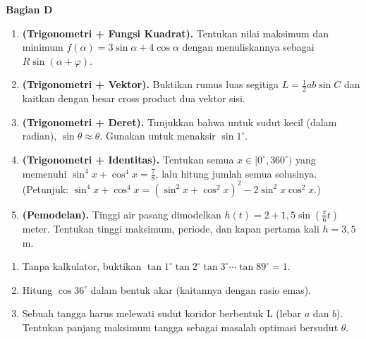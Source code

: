 \documentclass[11pt,a4paper]{report}
\theoremstyle{gaya}
\newcommand{\bagiansoal}[2]{%
  \par\medskip\noindent
  {\large\bfseries\color{biru}Bagian #1}\par\smallskip
  \addcontentsline{toc}{subsection}{Bagian #1}}
\begin{document}
\bagiansoal{D}{Expert (setara tahun pertama universitas --- sintesis antarbab)}
\begin{enumerate}[leftmargin=*]
  \item \textbf{(Trigonometri + Fungsi Kuadrat).} Tentukan nilai maksimum dan minimum $f(\alpha)=3\sin\alpha+4\cos\alpha$ dengan menuliskannya sebagai $R\sin(\alpha+\varphi)$.
  \item \textbf{(Trigonometri + Vektor).} Buktikan rumus luas segitiga $L=\tfrac12 ab\sin C$ dan kaitkan dengan besar cross product dua vektor sisi.
  \item \textbf{(Trigonometri + Deret).} Tunjukkan bahwa untuk sudut kecil (dalam radian), $\sin\theta\approx\theta$. Gunakan untuk menaksir $\sin 1^\circ$.
  \item \textbf{(Trigonometri + Identitas).} Tentukan semua $x\in[0^\circ,360^\circ)$ yang memenuhi $\sin^4x+\cos^4x=\tfrac{7}{8}$, lalu hitung jumlah semua solusinya. (Petunjuk: $\sin^4x+\cos^4x=(\sin^2x+\cos^2x)^2-2\sin^2x\cos^2x$.)
  \item \textbf{(Pemodelan).} Tinggi air pasang dimodelkan $h(t)=2+1{,}5\sin\!\left(\tfrac{\pi}{6}t\right)$ meter. Tentukan tinggi maksimum, periode, dan kapan pertama kali $h=3{,}5$ m.
\end{enumerate}

\begin{challenge}
\begin{enumerate}[leftmargin=*,topsep=2pt]
  \item Tanpa kalkulator, buktikan $\tan 1^\circ\tan2^\circ\tan3^\circ\cdots\tan89^\circ=1$.
  \item Hitung $\cos36^\circ$ dalam bentuk akar (kaitannya dengan rasio emas).
  \item Sebuah tangga harus melewati sudut koridor berbentuk L (lebar $a$ dan $b$). Tentukan panjang maksimum tangga sebagai masalah optimasi bersudut $\theta$.
\end{enumerate}
\end{challenge}

\end{document}
